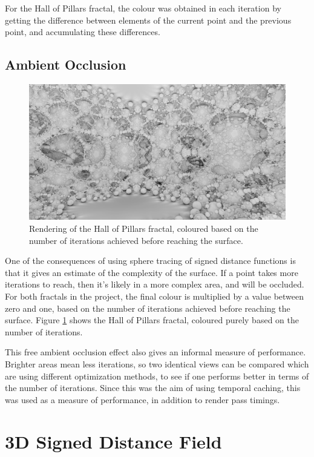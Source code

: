For the Hall of Pillars fractal, the colour was obtained in each iteration by getting the difference between elements of the current point and the previous point, and accumulating these differences.

\subsection{Ambient Occlusion}

\begin{figure}[ht]
	\centering
	\includegraphics[width=0.65\linewidth, frame]{Images/Ambient-Occlusion.png}
	\caption{Rendering of the Hall of Pillars fractal, coloured based on the number of iterations achieved before reaching the surface.}
	\label{figure:ambient-occlusion}
\end{figure}

One of the consequences of using sphere tracing of signed distance functions is that it gives an estimate of the complexity of the surface. If a point takes more iterations to reach, then it's likely in a more complex area, and will be occluded. For both fractals in the project, the final colour is multiplied by a value between zero and one, based on the number of iterations achieved before reaching the surface. Figure \ref{figure:ambient-occlusion} shows the Hall of Pillars fractal, coloured purely based on the number of iterations.\newline

This free ambient occlusion effect also gives an informal measure of performance. Brighter areas mean less iterations, so two identical views can be compared which are using different optimization methods, to see if one performs better in terms of the number of iterations. Since this was the aim of using temporal caching, this was used as a measure of performance, in addition to render pass timings.

\section{3D Signed Distance Field}

